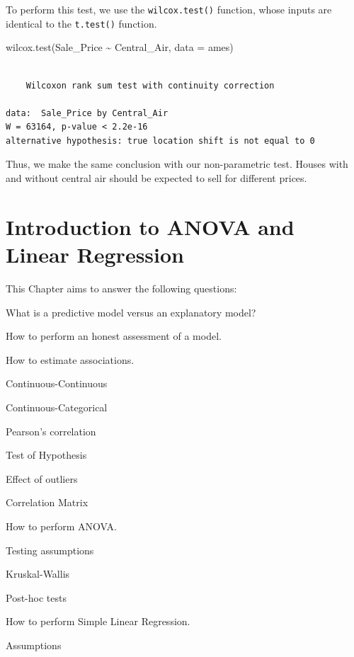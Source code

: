 \documentclass[
  letterpaper,
  DIV=11,
  numbers=noendperiod]{scrreprt}
\newenvironment{Shaded}{\begin{snugshade}}{\end{snugshade}}
\newcommand{\AttributeTok}[1]{\textcolor[rgb]{0.40,0.45,0.13}{#1}}
\newcommand{\FunctionTok}[1]{\textcolor[rgb]{0.28,0.35,0.67}{#1}}
\newcommand{\NormalTok}[1]{\textcolor[rgb]{0.00,0.23,0.31}{#1}}
\newcommand{\SpecialCharTok}[1]{\textcolor[rgb]{0.37,0.37,0.37}{#1}}
\begin{document}
To perform this test, we use the \texttt{wilcox.test()} function, whose
inputs are identical to the \texttt{t.test()} function.

\begin{Shaded}
\begin{Highlighting}[]
\FunctionTok{wilcox.test}\NormalTok{(Sale\_Price }\SpecialCharTok{\textasciitilde{}}\NormalTok{ Central\_Air, }\AttributeTok{data =}\NormalTok{ ames)}
\end{Highlighting}
\end{Shaded}

\begin{verbatim}

    Wilcoxon rank sum test with continuity correction

data:  Sale_Price by Central_Air
W = 63164, p-value < 2.2e-16
alternative hypothesis: true location shift is not equal to 0
\end{verbatim}

Thus, we make the same conclusion with our non-parametric test. Houses
with and without central air should be expected to sell for different
prices.


\hypertarget{sec-slr}{%
\chapter{Introduction to ANOVA and Linear Regression}\label{sec-slr}}

This Chapter aims to answer the following questions:

What is a predictive model versus an explanatory model?

How to perform an honest assessment of a model.

How to estimate associations.

Continuous-Continuous

Continuous-Categorical

Pearson's correlation

Test of Hypothesis

Effect of outliers

Correlation Matrix

How to perform ANOVA.

Testing assumptions

Kruskal-Wallis

Post-hoc tests

How to perform Simple Linear Regression.

Assumptions
\end{document}

